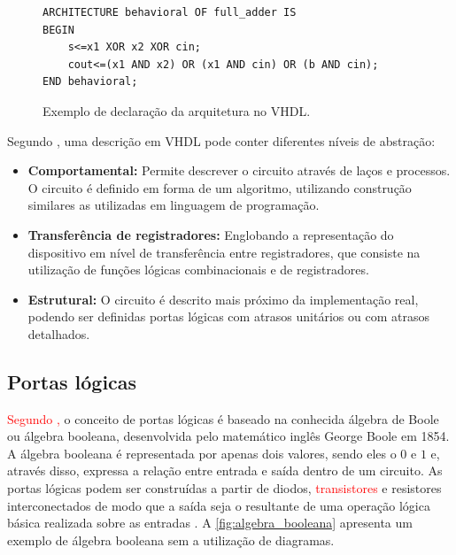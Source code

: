 \begin{figure}[!htp]
\caption{\label{fig:arquitetura} Exemplo de declaração da arquitetura no VHDL.}
	\begin{center}
    \begin{minipage}{0.6\textwidth}
    \begin{lstlisting}       
ARCHITECTURE behavioral OF full_adder IS
BEGIN
	s<=x1 XOR x2 XOR cin;
    cout<=(x1 AND x2) OR (x1 AND cin) OR (b AND cin);
END behavioral;

\end{lstlisting}
    \end{minipage}
	\end{center}
\end{figure}



Segundo \citeauthor{cappelattipraticando},\citeyear{cappelattipraticando} uma descrição em VHDL pode conter diferentes níveis de abstração:
\begin{itemize}
  \item \textbf{Comportamental:} Permite descrever o circuito através de laços e processos. O circuito é definido em forma de um algoritmo, utilizando construção similares as utilizadas em linguagem de programação.
  
  \item \textbf{Transferência de registradores:} Englobando a representação do dispositivo em nível de transferência entre registradores, que consiste na utilização de funções lógicas combinacionais e de registradores.
  
  \item \textbf{Estrutural:} O circuito é descrito mais próximo da implementação real, podendo ser definidas portas lógicas com atrasos unitários ou com atrasos detalhados.
\end{itemize}


\subsection{Portas lógicas}

\textcolor{red}{Segundo \cite{idoeta1982elementos},} o conceito de portas lógicas é baseado na conhecida álgebra de Boole ou álgebra booleana, desenvolvida pelo matemático inglês George Boole em 1854. A álgebra booleana é representada por apenas dois valores, sendo eles o $0$ e $1$ e, através disso, expressa a relação entre entrada e saída dentro de um circuito. As portas lógicas podem ser construídas a partir de diodos, \textcolor{red}{transistores} e resistores interconectados de modo que a saída seja o resultante de uma operação lógica básica realizada sobre as entradas \cite{tocci2003sistemas}. A \autoref{fig:algebra_booleana} apresenta um exemplo de álgebra booleana sem a utilização de diagramas.

